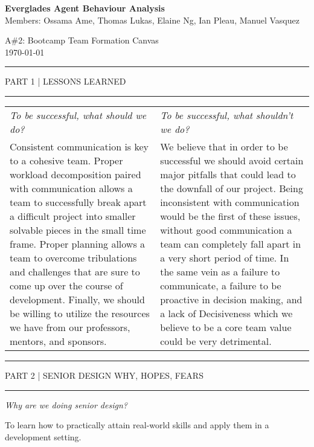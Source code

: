 \documentclass{article}
\newcommand{\makesection}[1]{\hrule\vskip1mm\uppercase{#1}\vskip1mm\hrule}
\begin{document}
\setlength{\parindent}{0cm}

\begin{minipage}[c]{.65\linewidth}
    \flushleft \textbf{Everglades Agent Behaviour Analysis} \\
    Members:
    Ossama Ame, 
    Thomas Lukas,
    Elaine Ng,
    Ian Pleau,
    Manuel Vasquez
\end{minipage} \hfill
\begin{minipage}[c]{.34\linewidth}
    \flushright A\#2: Bootcamp Team Formation Canvas \\
    \today
\end{minipage}

\vspace*{.75cm}

\makesection{Part 1 | Lessons Learned}
\vspace*{.15cm}
\begin{tabular}{p{.475\linewidth}|p{.475\linewidth}}
    \textit{To be successful, what should we do?} & \textit{To be successful, what shouldn’t we do?} \\
    Consistent communication is key to a cohesive team. Proper workload decomposition paired with communication allows a team to successfully break apart a difficult project into smaller solvable pieces in the small time frame. Proper planning allows a team to overcome tribulations and challenges that are sure to come up over the course of development. Finally, we should be willing to utilize the resources we have from our professors, mentors, and sponsors. & We believe that in order to be successful we should avoid certain major pitfalls that could lead to the downfall of our project. Being inconsistent with communication would be the first of these issues, without good communication a team can completely fall apart in a very short period of time. In the same vein as a failure to communicate, a failure to be proactive in decision making, and a lack of Decisiveness which we believe to be a core team value could be very detrimental.
\end{tabular}


\vspace*{.75cm}
\makesection{Part 2 | Senior Design Why, Hopes, Fears}
\vspace*{.15cm}
\centerline{
    \textit{Why are we doing senior design?}
}
\centerline{
    To learn how to practically attain real-world skills and apply them in a development setting.
}
\vspace*{.15cm}
    
\end{document}
